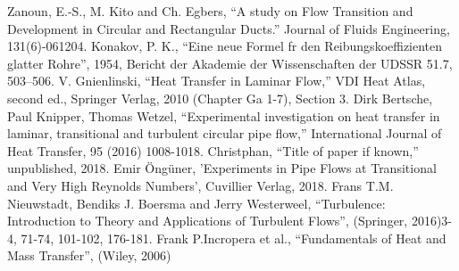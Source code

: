 \documentclass[conference]{IEEEtran}
\begin{document}
\begin{thebibliography}{00}
Zanoun, E.-S., M. Kito and Ch. Egbers, ``A study on Flow Transition and Development in Circular and Rectangular Ducts.'' Journal of Fluids Engineering, 131(6)-061204.
Konakov, P. K., ``Eine neue Formel fr den Reibungskoeffizienten glatter Rohre'', 1954, Bericht der Akademie der Wissenschaften der UDSSR 51.7, 503–506.
 V. Gnienlinski, ``Heat Transfer in Laminar Flow,'' VDI Heat Atlas, second ed., Springer Verlag, 2010 (Chapter Ga 1-7), Section 3.
 Dirk Bertsche, Paul Knipper, Thomas Wetzel, ``Experimental investigation on heat transfer in laminar, transitional and turbulent circular pipe flow,'' International Journal of Heat Transfer, 95 (2016) 1008-1018.
 Christphan, ``Title of paper if known,'' unpublished, 2018.
Emir Öngüner, 'Experiments in Pipe Flows at Transitional and Very High Reynolds Numbers', Cuvillier Verlag, 2018.
Frans T.M. Nieuwstadt, Bendiks J. Boersma and Jerry Westerweel, ``Turbulence: Introduction to Theory and Applications of Turbulent Flows'', (Springer, 2016)3-4, 71-74, 101-102, 176-181.
Frank P.Incropera et al., ``Fundamentals of Heat and Mass Transfer'', (Wiley, 2006)



%
%

\end{thebibliography}
\end{document}
